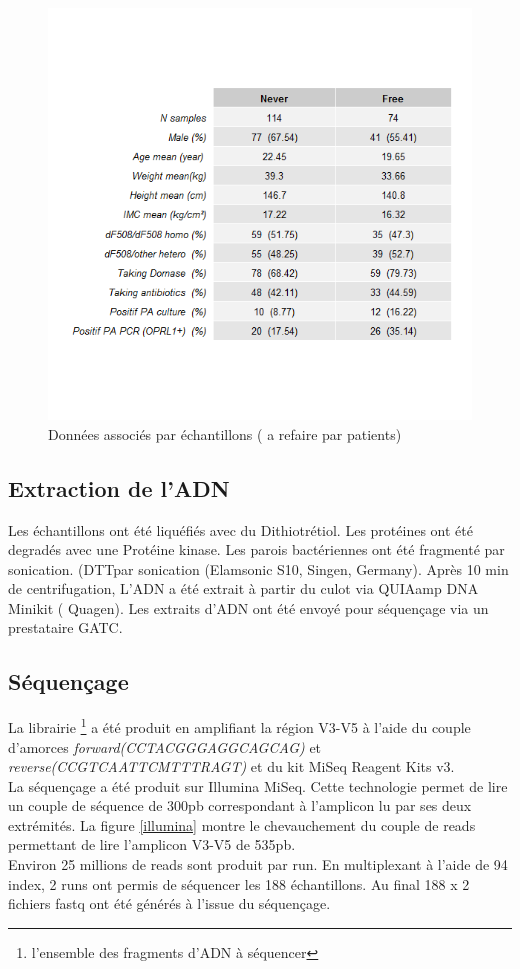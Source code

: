 \documentclass[12pt,a4paper]{article}
\begin{document}
\begin{figure}[ht]
\begin{center}
\includegraphics[scale=0.8]{img/summary.png}\hfill
\end{center}
\caption{Données associés par échantillons ( a refaire par patients)}
\label{summary}
\end{figure}



\subsection{Extraction de l’ADN}

Les échantillons ont été liquéfiés avec du Dithiotrétiol. Les protéines ont été degradés avec une Protéine kinase.
Les parois bactériennes ont été fragmenté par sonication. (DTTpar sonication (Elamsonic S10, Singen, Germany). Après 10 min de centrifugation, L’ADN a été extrait à partir du culot via QUIAamp DNA Minikit ( Quagen).
Les extraits d’ADN ont été envoyé pour séquençage via un prestataire GATC.

\subsection{Séquençage}
La librairie \footnote{l'ensemble des fragments d'ADN à séquencer} a été produit en amplifiant la région V3-V5 à l’aide du couple d’amorces  \textit{forward(CCTACGGGAGGCAGCAG)} et \textit{reverse(CCGTCAATTCMTTTRAGT)} et du kit MiSeq Reagent Kits v3. \\
La séquençage a été produit sur Illumina MiSeq. Cette technologie permet de lire un couple de séquence de  300pb correspondant à l'amplicon lu par ses deux extrémités. La figure \ref{illumina} montre le chevauchement du couple de reads permettant de lire l'amplicon V3-V5 de 535pb. \\
Environ 25 millions de reads sont produit par run. En multiplexant à l’aide de 94 index, 2 runs ont permis de séquencer les 188 échantillons.
Au final 188 x 2 fichiers fastq ont été générés à l’issue du séquençage.
\end{document}
